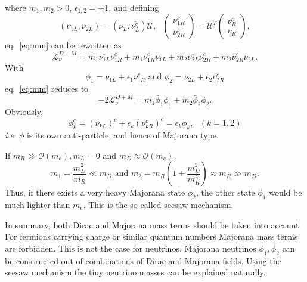 where $m_{1}, m_{2} > 0$, $\epsilon_{1,2} = \pm 1$, and defining
\begin{equation}
  \label{eq:mvet}
  (\nu_{1L}, \nu_{2L}) = \left( \overline{\nu}_{L},                 \overline{\nu^{c}_{L}} \right) \mathcal{U},\mbox{      }
  \left(\begin{array}{c} \nu^{c}_{1R} \\            
      \nu^{c}_{2R}\end{array}\right) = \mathcal{U}^{T}
  \left(\begin{array}{c} \nu^{c}_{R} \\ \nu_{R} \end{array}\right),
\end{equation}
eq.~\ref{eq:mm} can be rewritten as
\begin{equation}
  \label{eq:m12}
  \mathcal{L}_{\nu}^{D+M} = m_{1}\overline{\nu_{1L}}\nu^{c}_{1R} +  
  m_{1}\overline{\nu^{c}_{1R}}\nu_{1L} +
  m_{2}\overline{\nu_{2L}}\nu^{c}_{2R} +  
  m_{2}\overline{\nu^{c}_{2R}}\nu_{2L}.
\end{equation}
With
\begin{equation}
  \label{eq:mafi}
  \phi_{1} = \nu_{1L} + \epsilon_{1}\nu^{c}_{1R}
  \mbox{\ \ \ and \ \ \ }
  \phi_{2} = \nu_{2L} + \epsilon_{2}\nu^{c}_{2R}
\end{equation}
eq.~\ref{eq:mm} reduces to
\begin{equation}
  \label{eq:mv}
  -2\mathcal{L}_{\nu}^{D+M} = m_{1}\bar{\phi}_{1}\phi_{1} +
  m_{2}\bar{\phi}_{2}\phi_{2}.
\end{equation}
Obviously,
\begin{equation}
  \label{eq:mach}
  \phi^{c}_{k} = (\nu_{kL})^{c} + \epsilon_{k}(\nu^{c}_{kR})^{c} =
  \epsilon_{k}\phi_{k}, ~~~ (k=1,2)
\end{equation}
\textit{i.e.} $\phi$ is its own anti-particle, and hence of Majorana type.

If $m_{R} \gg \mathcal{O}(m_{e}), m_{L}=0$ and $m_{D} \approx \mathcal{O}(m_{e})$,
\begin{equation}
  \label{eq:seesaw}
  m_{1} = \frac{m^{2}_{D}}{m_{R}}\ll m_{D}  \mbox{\ \ \ and \ \ \ }  
  m_{2} = m_{R}(1+\frac{m^{2}_{D}}{m^{2}_{R}}) \approx m_{R} \gg m_{D}.
\end{equation}
Thus, if there exists a very heavy Majorana state $\phi_2$, the other state $\phi_1$ would be much lighter than $m_e$. This is the so-called seesaw mechanism.

In summary, both Dirac and Majorana mass terms should be taken into account. For fermions carrying charge or similar quantum numbers Majorana mass terms are forbidden. This is not the case for neutrinos. Majorana neutrinos $\phi_{1}, \phi_{2}$ can be constructed out of combinations of Dirac and Majorana fields. Using the seesaw mechanism the tiny neutrino masses can be explained naturally.

